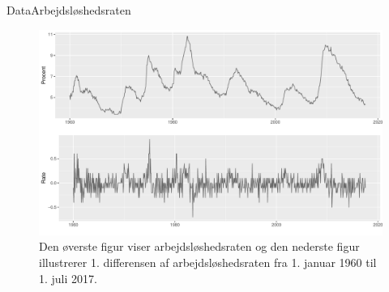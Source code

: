 \begin{frame}{Data}{Arbejdsløshedsraten}
%
\begin{figure}
 \includegraphics[width=1\linewidth, height=0.7\textheight]{slides/unemployment.pdf}
 \caption{Den øverste figur viser arbejdsløshedsraten og den nederste figur illustrerer 1. differensen af arbejdsløshedsraten fra 1. januar 1960 til 1. juli 2017.}
 \end{figure}
%
\end{frame}

